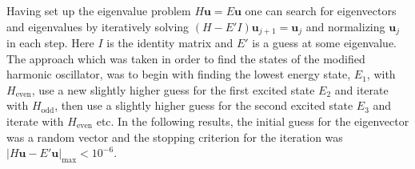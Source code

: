 \documentclass[twocolumn]{article}
\begin{document}
\begin{large}

Having set up the eigenvalue problem $H\mathbf{u} = E\mathbf{u}$ one can search for eigenvectors and eigenvalues by iteratively solving $(H-E'I)\mathbf{u}_{j+1} = \mathbf{u}_j$ and normalizing $\mathbf{u}_j$ in each step. Here $I$ is the identity matrix and $E'$ is a guess at some eigenvalue. The approach which was taken in order to find the states of the modified harmonic oscillator, was to begin with finding the lowest energy state, $E_1$, with $H_\text{even}$, use a new slightly higher guess for the first excited state $E_2$ and iterate with $H_\text{odd}$, then use a slightly higher guess for the second excited state $E_3$ and iterate with $H_\text{even}$ etc. In the following results, the initial guess for the eigenvector was a random vector and the stopping criterion for the iteration was $|H\mathbf{u}-E'\mathbf{u}|_\text{max}<10^{-6}$. 



\end{large}
\end{document}
